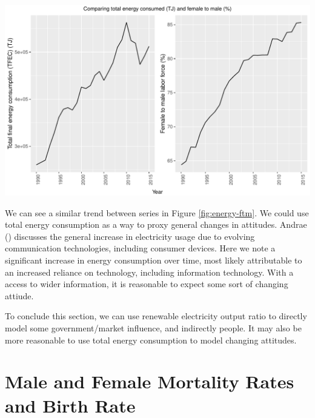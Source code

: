 \documentclass[11pt,a4paper,]{article}
\let\origfigure\figure
\let\endorigfigure\endfigure
\renewenvironment{figure}[1][2] {
    \expandafter\origfigure\expandafter[H]
} {
    \endorigfigure
}%
\begin{document}
\begin{figure}
\centering
\includegraphics{report_files/figure-latex/energy-ftm-1.pdf}
\caption{\label{fig:energy-ftm}Comparing total energy consumption and female
to male ratio.}
\end{figure}

We can see a similar trend between series in Figure
\ref{fig:energy-ftm}. We could use total energy consumption as a way to
proxy general changes in attitudes. Andrae (\textcite{Andrae2015})
discusses the general increase in electricity usage due to evolving
communication technologies, including consumer devices. Here we note a
significant increase in energy consumption over time, most likely
attributable to an increased reliance on technology, including
information technology. With a access to wider information, it is
reasonable to expect some sort of changing attiude.

To conclude this section, we can use renewable electricity output ratio
to directly model some government/market influence, and indirectly
people. It may also be more reasonable to use total energy consumption
to model changing attitudes.

\section*{Male and Female Mortality Rates and Birth Rate}
\end{document}
